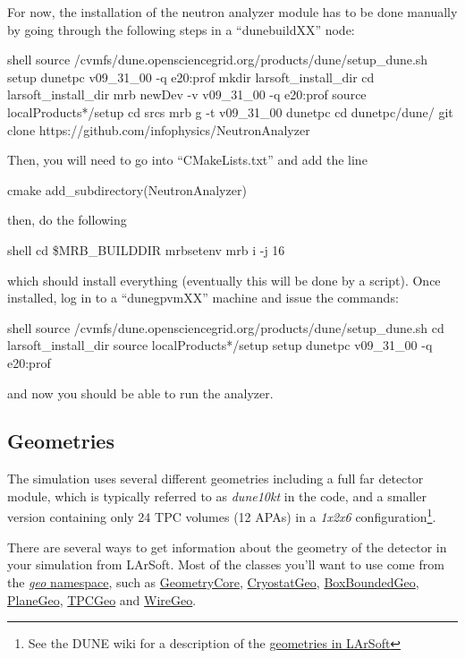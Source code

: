 \documentclass[8pt]{refart}
\begin{document}
For now, the installation of the neutron analyzer module has to be done manually by going through the following steps in a ``dunebuildXX'' node:
\begin{code}{shell}
source /cvmfs/dune.opensciencegrid.org/products/dune/setup_dune.sh
setup dunetpc v09_31_00 -q e20:prof
mkdir larsoft_install_dir
cd larsoft_install_dir
mrb newDev -v v09_31_00 -q e20:prof
source localProducts*/setup
cd srcs
mrb g -t v09_31_00 dunetpc
cd dunetpc/dune/
git clone https://github.com/infophysics/NeutronAnalyzer
\end{code}
Then, you will need to go into ``CMakeLists.txt'' and add the line
\begin{code}{cmake}
add_subdirectory(NeutronAnalyzer)
\end{code}
then, do the following
\begin{code}{shell}
cd \$MRB_BUILDDIR
mrbsetenv
mrb i -j 16
\end{code}
which should install everything (eventually this will be done by a script).  Once installed, log in to a ``dunegpvmXX'' machine and issue the commands:
\begin{code}{shell}
source /cvmfs/dune.opensciencegrid.org/products/dune/setup_dune.sh
cd larsoft_install_dir
source localProducts*/setup
setup dunetpc v09_31_00 -q e20:prof
\end{code}
and now you should be able to run the analyzer.

\subsection{Geometries}
The simulation uses several different geometries including a full far detector module, which is typically referred to as \textit{dune10kt} in the code, and a smaller version containing only 24 TPC volumes (12 APAs) in a \textit{1x2x6} configuration\footnote{See the DUNE wiki for a description of the \href{https://cdcvs.fnal.gov/redmine/projects/dunetpc/wiki/DUNE_Geometries}{geometries in LArSoft}}.


There are several ways to get information about the geometry of the detector in your simulation from LArSoft.  Most of the classes you'll want to use come from the \href{https://internal.dunescience.org/doxygen/namespacegeo.html}{\textit{geo} namespace}, such as \href{https://internal.dunescience.org/doxygen/classgeo_1_1GeometryCore.html}{GeometryCore}, \href{https://internal.dunescience.org/doxygen/classgeo_1_1CryostatGeo.html}{CryostatGeo}, \href{https://internal.dunescience.org/doxygen/classgeo_1_1BoxBoundedGeo.html}{BoxBoundedGeo}, \href{https://internal.dunescience.org/doxygen/classgeo_1_1PlaneGeo.html}{PlaneGeo}, \href{https://internal.dunescience.org/doxygen/classgeo_1_1TPCGeo.html}{TPCGeo} and \href{https://internal.dunescience.org/doxygen/classgeo_1_1WireGeo.html}{WireGeo}.
\end{document}
